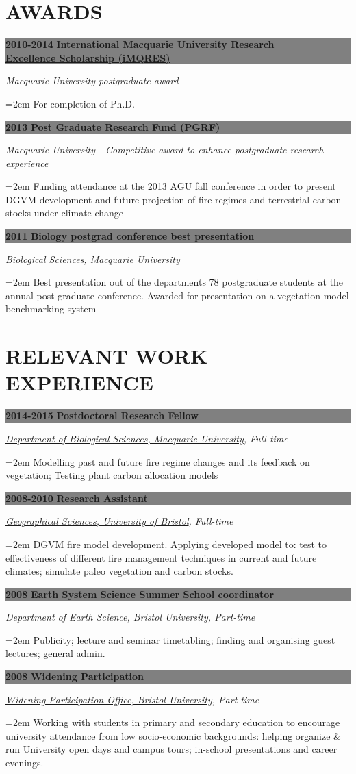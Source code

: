 \documentclass[paper=a4,fontsize=11pt]{scrartcl}	 			%
\newcommand{\sepspace}{\vspace*{0em}}			%
\newcommand{\NewPart}[1]{\vspace*{-0.5em} \section*{\uppercase{#1}} \vspace*{-0.75em} }
\newcommand{\EducationEntry}[4]{ \vspace*{0.7em}
		\noindent \colorbox{gray}{%
			\parbox{46em}{%
			\color{Black}\textbf{#2} \hspace{0.5cm} \textbf{#1}}} 				%
		\vspace*{-1em}
		\hfill 	\par				%
		\noindent \textit{#3} \par					%
		\noindent\hangindent=2em\hangafter=0 \small #4 	%
		\normalsize \par}
\begin{document}
  
\NewPart{Awards}
\EducationEntry{\href{http://www.hdr.mq.edu.au/information_about/scholarships}{International Macquarie University Research \\ Excellence Scholarship (iMQRES)}}{2010-2014} {\newline Macquarie University postgraduate award}{For completion of Ph.D.}
\sepspace

\EducationEntry{\href{http://www.hdr.mq.edu.au/information_for/current_candidates/financial_support}{Post Graduate Research Fund (PGRF)}}{2013} {Macquarie University - Competitive award to enhance postgraduate research experience}{Funding attendance at the 2013 AGU fall conference in order to present DGVM development and future projection of fire regimes and terrestrial carbon stocks under climate change}
\sepspace

\EducationEntry{Biology postgrad conference best presentation}{2011} {Biological Sciences, Macquarie University}{Best presentation out of the departments 78 postgraduate students at the annual post-graduate conference. Awarded for presentation on a vegetation model benchmarking system}

\NewPart{Relevant Work experience}{}

\EducationEntry{Postdoctoral Research Fellow}{2014-2015}{\href{http://bcd.mq.edu.au/} {Department of Biological Sciences, Macquarie University}, Full-time}
{Modelling past and future fire regime changes and its feedback on vegetation; Testing plant carbon allocation models}
\sepspace
\pagebreak

\EducationEntry{Research  Assistant}{2008-2010}{\href{http://www.bristol.ac.uk/geography/} {Geographical Sciences, University of Bristol}, Full-time}
{DGVM fire model development. Applying developed model to: test to effectiveness of different fire management techniques in current and future climates; simulate paleo vegetation and carbon stocks.}
\sepspace

\EducationEntry{\href{http://www.greencycles.org/greencycles1/ES4\%20flyer\_2008.pdf}{Earth System Science Summer School coordinator}}{2008}{Department of Earth Science, Bristol University, Part-time}{Publicity; lecture and seminar timetabling; finding and organising guest lectures; general admin.}
\sepspace 
%

\EducationEntry{Widening Participation}{2008}{\href{http://www.bristol.ac.uk/sraa/wpur-office/}{Widening Participation Office, Bristol University}, Part-time}{Working with students in primary and secondary education to encourage university attendance from low socio-economic backgrounds: helping organize \& run University open days and campus tours; in-school presentations and career evenings.}
  
\end{document}
